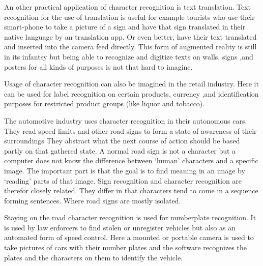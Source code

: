 An other practical application of character recognition is text translation. Text recognition for the use of translation is useful for example tourists who use their smart-phone to take a picture of a sign and have that sign translated in their native language by an translation app. Or even better, have their text translated and inserted into the camera feed directly. This form of augmented reality is still in its infantsy but being able to recognize and digitize texts on walls, signs ,and posters for all kinds of purposes is not that hard to imagine. 

Usage of character recognition can also be imagined in the retail industry. Here it can be used for label recognition on certain products, currency ,and identification purposes for restricted product groups (like liquor and tobacco).

The automotive industry uses character recognition in their autonomous cars. They read speed limits and other road signs to form a state of awareness of their surroundings They abstract what the next course of action should be based partly on that gathered state. A normal road sign is not a character but a computer does not know the difference between `human' characters and a specific image. The important part is that the goal is to find meaning in an image by `reading' parts of that image. Sign recognition and character recognition are therefor closely related. They differ in that characters tend to come in a sequence forming sentences. Where road signs are mostly isolated.

Staying on the road character recognition is used for numberplate recognition. It is used by law enforcers to find stolen or unregister vehicles but also as an automated form of speed control. Here a mounted or portable camera is used to take pictures of cars with their number plates and the software recognizes the plates and the characters on them to identify the vehicle. 




